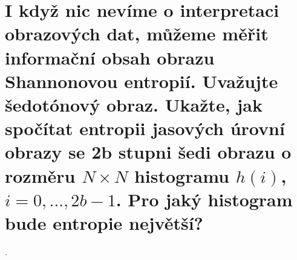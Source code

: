 \section{I když nic nevíme o interpretaci obrazových dat, můžeme měřit informační obsah obrazu Shannonovou entropií. 
Uvažujte šedotónový obraz. Ukažte, jak spočítat entropii jasových úrovní obrazy se 2b stupni šedi obrazu o rozměru 
\texorpdfstring{$N \times N$}{N x N} histogramu \texorpdfstring{$h(i)$}{h(i)}, 
\texorpdfstring{$i=0,\dots,2b-1$}{i=0,\dots,2b-1}. Pro jaký histogram bude entropie největší?}.